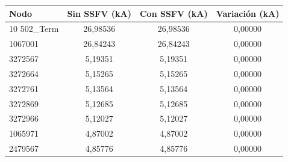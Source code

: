 \begin{tabular}{lccc}
\toprule
\textbf{Nodo} & \textbf{Sin SSFV (kA)} & \textbf{Con SSFV (kA)} & \textbf{Variación (kA)} \\
\midrule
10 502\_Term & 26,98536 & 26,98536 & 0,00000 \\
1067001 & 26,84243 & 26,84243 & 0,00000 \\
3272567 & 5,19351 & 5,19351 & 0,00000 \\
3272664 & 5,15265 & 5,15265 & 0,00000 \\
3272761 & 5,13564 & 5,13564 & 0,00000 \\
3272869 & 5,12685 & 5,12685 & 0,00000 \\
3272966 & 5,12027 & 5,12027 & 0,00000 \\
1065971 & 4,87002 & 4,87002 & 0,00000 \\
2479567 & 4,85776 & 4,85776 & 0,00000 \\
\bottomrule
\end{tabular}
